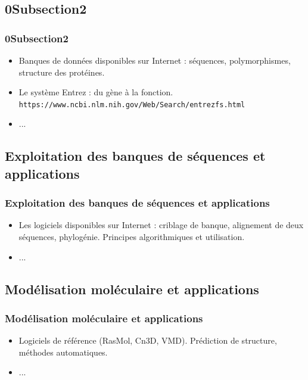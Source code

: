\documentclass{beamer}
\begin{document}
\subsection{ \titleSection0Subsection2 }
\begin{frame}
	\frametitle{ \titleSection0Subsection2 }
	\begin{itemize}
		\item Banques de donn{\'e}es disponibles sur Internet : s{\'e}quences, polymorphismes, structure des prot{\'e}ines. 
		\item Le syst{\`e}me Entrez : du g{\`e}ne {\`a} la fonction. \texttt{https://www.ncbi.nlm.nih.gov/Web/Search/entrezfs.html}
		\item ... 
	\end{itemize}
\end{frame}

\def\titleSection0Subsection3{Exploitation des banques de s{\'e}quences et applications}
\subsection{ \titleSection0Subsection3 }
\begin{frame}
	\frametitle{ \titleSection0Subsection3 }
	\begin{itemize}
		\item Les logiciels disponibles sur Internet : criblage de banque, alignement de deux s{\'e}quences, phylog{\'e}nie. Principes algorithmiques et utilisation.
		\item ... 
	\end{itemize}
\end{frame}

\def\titleSection0Subsection4{Mod{\'e}lisation mol{\'e}culaire et applications}
\subsection{ \titleSection0Subsection4 }
\begin{frame}
	\frametitle{ \titleSection0Subsection4 }
	\begin{itemize}
		\item Logiciels de r{\'e}f{\'e}rence (RasMol, Cn3D, VMD). Pr{\'e}diction de structure, m{\'e}thodes automatiques.
		\item ... 
	\end{itemize}
\end{frame}

\def\titleSection0Subsection5{Probl{\'e}matiques Bio-informatiques li{\'e}es aux nouvelles technologies}
\end{document}
